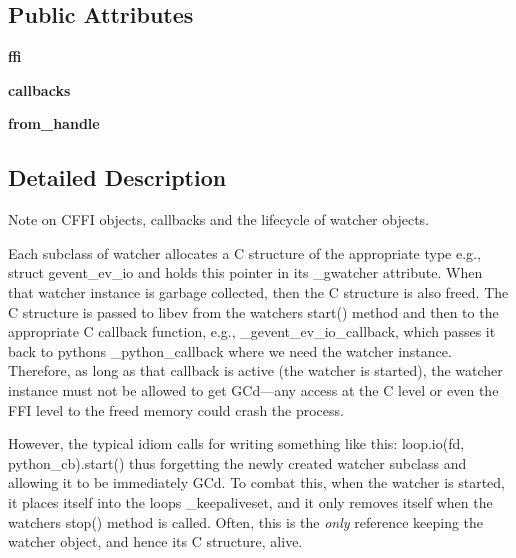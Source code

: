 \subsection*{Public Attributes}
\begin{DoxyCompactItemize}
\item 
\mbox{\label{classgevent_1_1__ffi_1_1loop_1_1_abstract_callbacks_a09b25285f9a6e2446a44b15f1b5522e2}} 
{\bfseries ffi}
\item 
\mbox{\label{classgevent_1_1__ffi_1_1loop_1_1_abstract_callbacks_aa71949d30abd05f97bc0ca43f9cf58f2}} 
{\bfseries callbacks}
\item 
\mbox{\label{classgevent_1_1__ffi_1_1loop_1_1_abstract_callbacks_a666ebdcd58a473f35ec7ca6b4305e1ca}} 
{\bfseries from\+\_\+handle}
\end{DoxyCompactItemize}


\subsection{Detailed Description}
Note on C\+F\+FI objects, callbacks and the lifecycle of watcher objects. 

Each subclass of {\ttfamily watcher} allocates a C structure of the appropriate type e.\+g., struct gevent\+\_\+ev\+\_\+io and holds this pointer in its {\ttfamily \+\_\+gwatcher} attribute. When that watcher instance is garbage collected, then the C structure is also freed. The C structure is passed to libev from the watcher\textquotesingle{}s start() method and then to the appropriate C callback function, e.\+g., \+\_\+gevent\+\_\+ev\+\_\+io\+\_\+callback, which passes it back to python\textquotesingle{}s \+\_\+python\+\_\+callback where we need the watcher instance. Therefore, as long as that callback is active (the watcher is started), the watcher instance must not be allowed to get GC\textquotesingle{}d---any access at the C level or even the F\+FI level to the freed memory could crash the process.

However, the typical idiom calls for writing something like this\+: loop.\+io(fd, python\+\_\+cb).start() thus forgetting the newly created watcher subclass and allowing it to be immediately GC\textquotesingle{}d. To combat this, when the watcher is started, it places itself into the loop\textquotesingle{}s {\ttfamily \+\_\+keepaliveset}, and it only removes itself when the watcher\textquotesingle{}s {\ttfamily stop()} method is called. Often, this is the {\itshape only} reference keeping the watcher object, and hence its C structure, alive.

